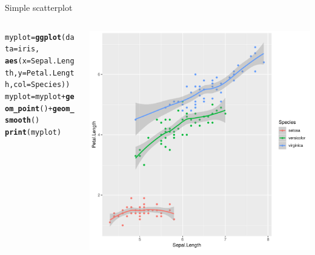 \documentclass[aspectratio=169]{beamer}\usepackage[]{graphicx}\usepackage[]{color}
\makeatletter
\def\maxwidth{ %
  \ifdim\Gin@nat@width>\linewidth
    \linewidth
  \else
    \Gin@nat@width
  \fi
}
\newcommand{\hlopt}[1]{\textcolor[rgb]{0,0,0}{#1}}%
\newcommand{\hlstd}[1]{\textcolor[rgb]{0.345,0.345,0.345}{#1}}%
\newcommand{\hlkwb}[1]{\textcolor[rgb]{0.69,0.353,0.396}{#1}}%
\newcommand{\hlkwc}[1]{\textcolor[rgb]{0.333,0.667,0.333}{#1}}%
\newcommand{\hlkwd}[1]{\textcolor[rgb]{0.737,0.353,0.396}{\textbf{#1}}}%
\newenvironment{kframe}{%
 \def\at@end@of@kframe{}%
 \ifinner\ifhmode%
  \def\at@end@of@kframe{\end{minipage}}%
  \begin{minipage}{\columnwidth}%
 \fi\fi%
 \def\FrameCommand##1{\hskip\@totalleftmargin \hskip-\fboxsep
 \colorbox{shadecolor}{##1}\hskip-\fboxsep
     \hskip-\linewidth \hskip-\@totalleftmargin \hskip\columnwidth}%
 \MakeFramed {\advance\hsize-\width
   \@totalleftmargin\z@ \linewidth\hsize
   \@setminipage}}%
 {\par\unskip\endMakeFramed%
 \at@end@of@kframe}
\newenvironment{knitrout}{}{} %
\makeatother
\begin{document}
\begin{frame}[fragile]{Simple scatterplot}
\begin{columns}
  \begin{column}{0.50\textwidth}
\begin{knitrout}\tiny
{}\color{fgcolor}\begin{kframe}
\begin{alltt}
\hlstd{myplot} \hlkwb{=} \hlkwd{ggplot}\hlstd{(}\hlkwc{data}\hlstd{=iris,}
                \hlkwd{aes}\hlstd{(}\hlkwc{x}\hlstd{=Sepal.Length,} \hlkwc{y}\hlstd{=Petal.Length,} \hlkwc{col}\hlstd{=Species))}
\hlstd{myplot} \hlkwb{=} \hlstd{myplot} \hlopt{+} \hlkwd{geom_point}\hlstd{()} \hlopt{+} \hlkwd{geom_smooth}\hlstd{()}
\hlkwd{print}\hlstd{(myplot)}
\end{alltt}
\end{kframe}
\end{knitrout}
  \end{column}
  \begin{column}{0.5\textwidth}
\begin{knitrout}\scriptsize
{}\color{fgcolor}
\includegraphics[width=\maxwidth]{figure/unnamed-chunk-9-1} 

\end{knitrout}
  \end{column}
\end{columns}
\end{frame}
\end{document}
